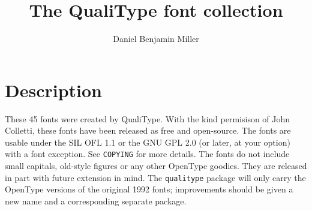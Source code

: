 \documentclass[12pt]{article}
\author{Daniel Benjamin Miller}
\title{The QualiType font collection}
\begin{document}
\maketitle
\section{Description}
These 45 fonts were created by QualiType. With the kind permisison of John
Colletti, these fonts have been released as free and open-source. The fonts
are usable under the SIL OFL 1.1 or the GNU GPL 2.0 (or later, at your option)
with a font exception. See \texttt{COPYING} for more details. The fonts do not include small capitals, old-style figures or any other OpenType goodies. They are released in part with future extension in mind. The \texttt{qualitype} package will only carry the OpenType versions of the original 1992 fonts; improvements should be given a new name and a corresponding separate package.
\end{document}
